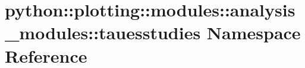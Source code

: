 \hypertarget{namespacepython_1_1plotting_1_1modules_1_1analysis__modules_1_1tauesstudies}{
\section{python::plotting::modules::analysis\_\-modules::tauesstudies Namespace Reference}
\label{namespacepython_1_1plotting_1_1modules_1_1analysis__modules_1_1tauesstudies}
}
